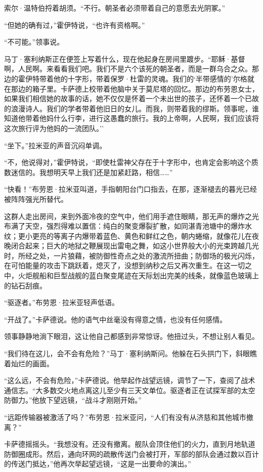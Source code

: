 \documentclass[AutoFakeBold=true]{book}
\begin{document}
索尔·温特伯捋着胡须。``不行。朝圣者必须带着自己的意愿去光阴冢。''

``但她的确有过，''霍伊特说，``也许有资格啊。''

``不可能。''领事说。

马丁·塞利纳斯正在便签上写着什么，现在他起身在房间里踱步。``耶稣·基督啊，人民啊。来看看我们吧。我们不是六个该死的朝圣者，而是一群乌合之众。那边的霍伊特带着他的十字形，带着保罗·杜雷的灵魂。我们的`半带感情的'尔格就在那边的箱子里。卡萨德上校带着他脑中关于莫尼塔的回忆。那边的布劳恩女士，如果我们相信她的故事的话，她不仅仅是怀着一个未出世的孩子，还怀着一个已故的浪漫诗人。我们的学者带着他旧日的女儿。而我，则带着我的缪斯。领事呢，谁知道他带着他妈什么行李，进行这愚蠢的旅行。我的上帝啊，人民啊，我们应该将这次旅行评为他妈的一流团队。''

``坐下。''拉米亚的声音沉闷单调。

``不，他说得对，''霍伊特说，``即使杜雷神父存在于十字形中，也肯定会影响这个质数迷信的。我想明天早上我们还是加紧赶路，相信……''

``快看！''布劳恩·拉米亚叫道，手指朝阳台门口指去，在那，逐渐褪去的暮光已经被阵阵强光所替代。

这群人走出房间，来到外面冷夜的空气中，他们用手遮住眼睛，那无声的爆炸之光布满了天空，强烈得难以置信：纯白的聚变爆裂扩散，如同湛青池塘中的爆炸水纹；更小更亮的等离子内爆带着蓝色、黄色和鲜红之色，朝内蜷缩，就像花儿在夜晚闭合起来；巨大的地狱之鞭展现出雷电之舞，如这小世界般大小的光束跨越几光时，所经之处，一片狼藉，被防御性奇点之处的激流所扭曲；防御场的极光闪烁，在可怕能量的攻击下跳跃着，熄灭了，没想到纳秒之后又再次重生。在这一切之中，火炬舰船和巨型战舰的蓝白聚变尾迹在天际划出完美的线条，就像蓝色玻璃上的钻石刮痕。

``驱逐者。''布劳恩·拉米亚轻声低语。

``开战了。''卡萨德说。他的语气中丝毫没有得意之情，也没有任何感情。

领事静静地淌下眼泪，这让他自己都感到非常惊讶。他扭过头，不想让别人看见。

``我们待在这儿，会不会有危险？''马丁·塞利纳斯问。他躲在石头拱门下，斜眼瞧着灿烂的画面。

``这么远，不会有危险，''卡萨德说。他举起作战望远镜，调节了一下，查阅了战术通信志。``大多数交火地点离这儿至少有三天文单位。驱逐者正在试探军部的太空防御力。''他放下望远镜，``战斗才刚刚开始。''

``远距传输器被激活了吗？''布劳恩·拉米亚问，``人们有没有从济慈和其他城市撤离？''

卡萨德摇摇头。``我想没有。还没有撤离。舰队会顶住他们的火力，直到月地轨道防御圈成形。然后，通向环网的疏散传送门会被打开，军部的部队会通过数以百计的传送门抵达，''他再次举起望远镜，``这是一出要命的演出。''
\end{document}
